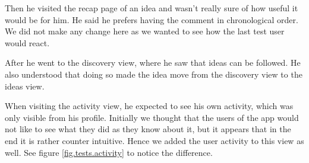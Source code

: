 \documentclass[a4paper,12pt, oneside]{article}
\begin{document}
Then he visited the recap page of an idea and wasn't really sure of how useful it would be for him.
He said he prefers having the comment in chronological order.
We did not make any change here as we wanted to see how the last test user would react.

After he went to the discovery view, where he saw that ideas can be followed.
He also understood that doing so made the idea move from the discovery view to the ideas view.

When visiting the activity view, he expected to see his own activity, which was only visible from his profile.
Initially we thought that the users of the app would not like to see what they did as they know about it, but it appears that in the end it is rather counter intuitive.
Hence we added the user activity to this view as well.
See figure \ref{fig.tests.activity} to notice the difference.
\end{document}
